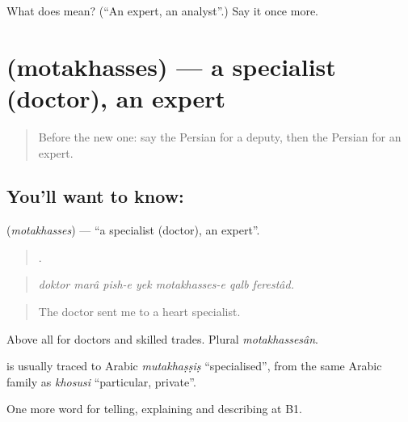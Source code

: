 \begin{tcolorbox}[breakable,colback=teal!4,colframe=teal!35!black,title={Before you move on}]
What does  mean? (\textquotedblleft{}An expert, an analyst\textquotedblright{}.) Say it once more.
\end{tcolorbox}
\section[\texorpdfstring{\fa{متخصص} (motakhasses)}{متخصص (motakhasses)}]{ (motakhasses) — a specialist (doctor), an expert}

\label{lesson:FA-C381-motakhasses}



\begin{quote}
Before the new one: say the Persian for a deputy, then the Persian for an expert.
\end{quote}

\subsection*{You'll want to know: }
\textbf{} (\emph{motakhasses}) — \textquotedblleft{}a specialist (doctor), an expert\textquotedblright{}.

\begin{quote}
      .
\end{quote}

\begin{quote}
\emph{doktor marâ pish-e yek motakhasses-e qalb ferestâd.}
\end{quote}

\begin{quote}
The doctor sent me to a heart specialist.
\end{quote}

Above all for doctors and skilled trades. Plural \emph{motakhassesân}.

\begin{cousinweb}
\textbf{} is usually traced to Arabic \emph{mutakhaṣṣiṣ} \textquotedblleft{}specialised\textquotedblright{}, from the same Arabic family as \emph{khosusi} \textquotedblleft{}particular, private\textquotedblright{}.
\end{cousinweb}

\begin{grammarlens}[title={What you've built}]
One more word for telling, explaining and describing at B1.
\end{grammarlens}


